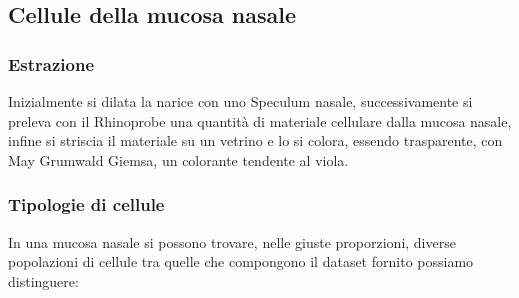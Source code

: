 \documentclass[italian,10pt,a4paper]{article}
\begin{document}
			\subsection{Cellule della mucosa nasale}
			
				\subsubsection{Estrazione}
					Inizialmente si dilata la narice con uno Speculum nasale, successivamente si preleva con il Rhinoprobe una quantità di materiale cellulare dalla mucosa nasale, infine si striscia il materiale su un vetrino e lo si colora, essendo trasparente, con May Grumwald Giemsa, un colorante tendente al viola.
					
			
				\subsubsection{Tipologie di cellule}
					In una mucosa nasale si possono trovare, nelle giuste proporzioni, diverse popolazioni di cellule tra quelle che compongono il dataset fornito possiamo distinguere:
					
\end{document}
